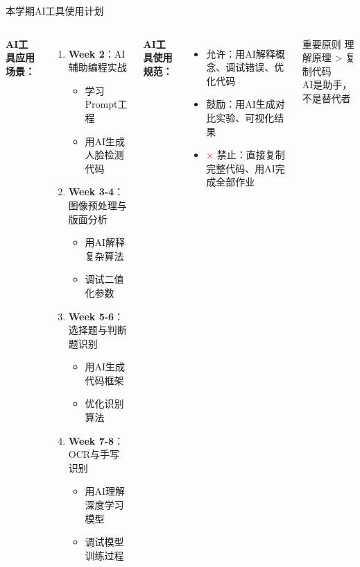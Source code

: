 \begin{frame}[fragile]{本学期AI工具使用计划}
    \begin{columns}
        \textbf{AI工具应用场景：}
        \begin{enumerate}
            \item \textbf{Week 2}：AI辅助编程实战
            \begin{itemize}
                \item 学习Prompt工程
                \item 用AI生成人脸检测代码
            \end{itemize}
            \item \textbf{Week 3-4}：图像预处理与版面分析
            \begin{itemize}
                \item 用AI解释复杂算法
                \item 调试二值化参数
            \end{itemize}
            \item \textbf{Week 5-6}：选择题与判断题识别
            \begin{itemize}
                \item 用AI生成代码框架
                \item 优化识别算法
            \end{itemize}
            \item \textbf{Week 7-8}：OCR与手写识别
            \begin{itemize}
                \item 用AI理解深度学习模型
                \item 调试模型训练过程
            \end{itemize}
        \end{enumerate}

        \textbf{AI工具使用规范：}
        \begin{itemize}
            \item \textcolor{green!60!black}{\checkmark} 允许：用AI解释概念、调试错误、优化代码
            \item \textcolor{green!60!black}{\checkmark} 鼓励：用AI生成对比实验、可视化结果
            \item \textcolor{red}{$\times$} 禁止：直接复制完整代码、用AI完成全部作业
        \end{itemize}

        \vspace{0.3cm}
        \begin{alertblock}{重要原则}
        理解原理 > 复制代码\\
        AI是助手，不是替代者
        \end{alertblock}
    \end{columns}
\end{frame}

